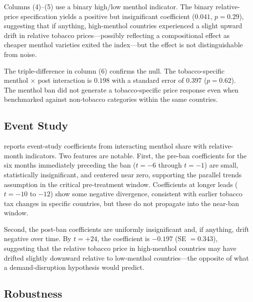 \documentclass[12pt]{article}
\begin{document}
Columns (4)--(5) use a binary high/low menthol indicator. The binary relative-price specification yields a positive but insignificant coefficient ($0.041$, $p = 0.29$), suggesting that if anything, high-menthol countries experienced a slight upward drift in relative tobacco prices---possibly reflecting a compositional effect as cheaper menthol varieties exited the index---but the effect is not distinguishable from noise.

The triple-difference in column (6) confirms the null. The tobacco-specific menthol $\times$ post interaction is $0.198$ with a standard error of $0.397$ ($p = 0.62$). The menthol ban did not generate a tobacco-specific price response even when benchmarked against non-tobacco categories within the same countries.



\subsection{Event Study}

 reports event-study coefficients from interacting menthol share with relative-month indicators. Two features are notable. First, the pre-ban coefficients for the six months immediately preceding the ban ($t = -6$ through $t = -1$) are small, statistically insignificant, and centered near zero, supporting the parallel trends assumption in the critical pre-treatment window. Coefficients at longer leads ($t = -10$ to $-12$) show some negative divergence, consistent with earlier tobacco tax changes in specific countries, but these do not propagate into the near-ban window.

Second, the post-ban coefficients are uniformly insignificant and, if anything, drift negative over time. By $t = +24$, the coefficient is $-0.197$ (SE $= 0.343$), suggesting that the relative tobacco price in high-menthol countries may have drifted slightly downward relative to low-menthol countries---the opposite of what a demand-disruption hypothesis would predict.



\subsection{Robustness}
\end{document}
